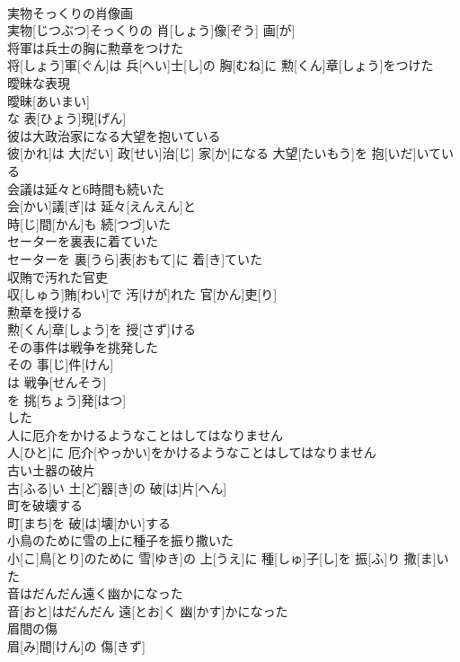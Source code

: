 \documentclass[8pt]{extreport}
\begin{document}
\begin{CJK}{UTF8}{min}
\\	実物そっくりの肖像画	
\\	実物[じつぶつ]そっくりの 肖[しょう]像[ぞう] 画[が]
\\	将軍は兵士の胸に勲章をつけた	
\\	将[しょう]軍[ぐん]は 兵[へい]士[し]の 胸[むね]に 勲[くん]章[しょう]をつけた
\\	曖昧な表現	
\\	曖昧[あいまい]
\\	な 表[ひょう]現[げん]
\\	彼は大政治家になる大望を抱いている	
\\	彼[かれ]は 大[だい] 政[せい]治[じ] 家[か]になる 大望[たいもう]を 抱[いだ]いている
\\	会議は延々と6時間も続いた	
\\	会[かい]議[ぎ]は 延々[えんえん]と 
\\	時[じ]間[かん]も 続[つづ]いた
\\	セーターを裏表に着ていた	
\\	セーターを 裏[うら]表[おもて]に 着[き]ていた
\\	収賄で汚れた官吏	
\\	収[しゅう]賄[わい]で 汚[けが]れた 官[かん]吏[り]
\\	勲章を授ける	
\\	勲[くん]章[しょう]を 授[さず]ける
\\	その事件は戦争を挑発した	
\\	その 事[じ]件[けん]
\\	は 戦争[せんそう]
\\	を 挑[ちょう]発[はつ]
\\	した
\\	人に厄介をかけるようなことはしてはなりません	
\\	人[ひと]に 厄介[やっかい]をかけるようなことはしてはなりません
\\	古い土器の破片	
\\	古[ふる]い 土[ど]器[き]の 破[は]片[へん]
\\	町を破壊する	
\\	町[まち]を 破[は]壊[かい]する
\\	小鳥のために雪の上に種子を振り撒いた	
\\	小[こ]鳥[とり]のために 雪[ゆき]の 上[うえ]に 種[しゅ]子[し]を 振[ふ]り 撒[ま]いた
\\	音はだんだん遠く幽かになった	
\\	音[おと]はだんだん 遠[とお]く 幽[かす]かになった
\\	眉間の傷	
\\	眉[み]間[けん]の 傷[きず]

\end{CJK}
\end{document}
